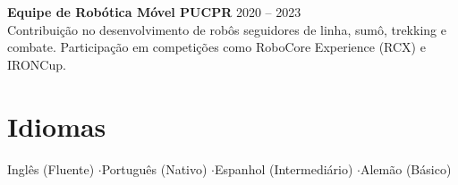 \documentclass[11pt,a4paper]{article}
\begin{document}
\vspace{3pt}

\textbf{Equipe de Robótica Móvel PUCPR} \hfill 2020 -- 2023 \\
Contribuição no desenvolvimento de robôs seguidores de linha, sumô, trekking e combate. Participação em competições como RoboCore Experience (RCX) e IRONCup.

\section{Idiomas}

\noindent Inglês (Fluente) \enspace$\cdot$\enspace Português (Nativo) \enspace$\cdot$\enspace Espanhol (Intermediário) \enspace$\cdot$\enspace Alemão (Básico)
\end{document}
